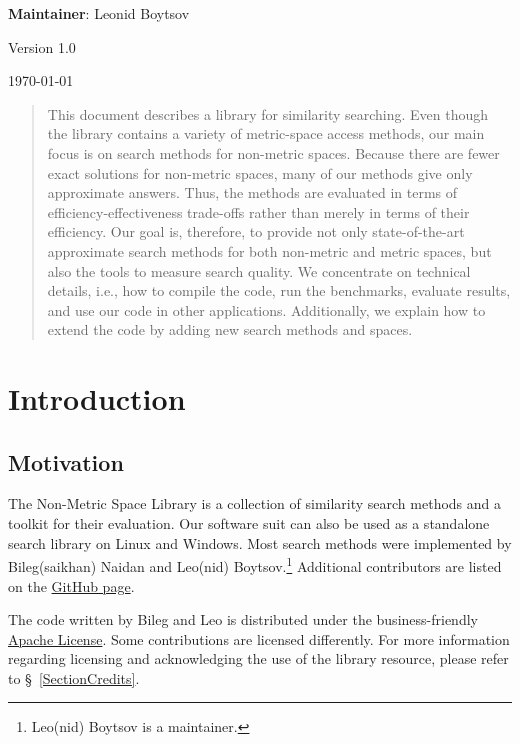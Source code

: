 \documentclass[runningheads,a4paper]{llncs}
\begin{document}
{\begin{center}{\small \textbf{Maintainer}: Leonid Boytsov}\end{center}}
{\begin{center}{Version 1.0}\end{center} 
{\begin{center}{{\today}}\end{center}}

\begin{abstract}
This document describes a library for similarity searching.
Even though the library contains a variety of metric-space access methods,
our main focus is on search methods for non-metric spaces.
Because there are fewer exact solutions for non-metric spaces,
many of our methods give only approximate answers. 
Thus, the methods
are evaluated in terms of efficiency-effectiveness trade-offs
rather than merely in terms of their efficiency.
Our goal is, therefore, to provide
not only state-of-the-art approximate search methods for 
both non-metric and metric spaces,
but also the tools to measure search quality.
We concentrate on technical details, i.e., 
how to compile the code, run the benchmarks, evaluate results,
and use our code in other applications.
Additionally, we explain how to extend the code by adding
new search methods and spaces.
\end{abstract}

\section{Introduction}
\subsection{Motivation}
The Non-Metric Space Library is a collection of
similarity search methods and a toolkit for their evaluation.
Our software suit can also be used as a standalone search library on Linux and Windows. 
Most search methods were implemented by Bileg(saikhan) Naidan and Leo(nid) Boytsov.\footnote{Leo(nid) Boytsov is a maintainer.}
Additional contributors are listed on the \href{https://github.com/searchivarius/NonMetricSpaceLib}{GitHub 
page}.

The code written by Bileg and Leo is distributed under the business-friendly \href{http://apache.org/licenses/LICENSE-2.0}{Apache License}. 
Some contributions are licensed differently.
For more information regarding licensing and acknowledging the use of the library
resource, please refer to \S~\ref{SectionCredits}.

}
\end{document}
